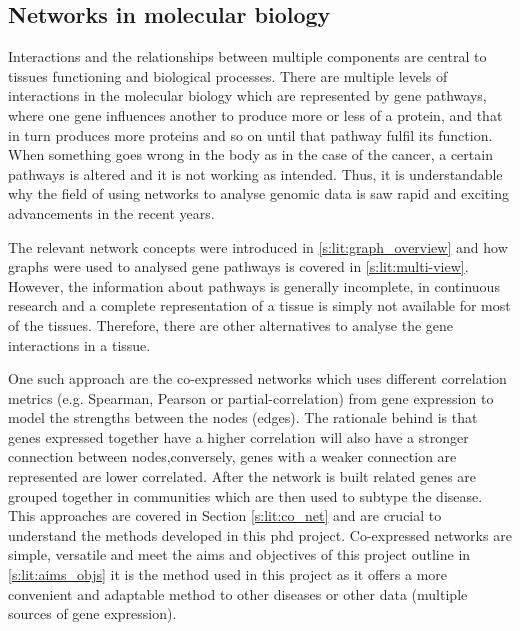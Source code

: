 \subsection{Networks in molecular biology} \label{s:lit:nets_bio}

\vspace{3mm}
\vspace{3mm}

Interactions and the relationships between multiple components are central to tissues functioning and biological processes. There are multiple levels of interactions in the molecular biology which are represented by gene pathways, where one gene influences another to produce more or less of a protein, and that in turn produces more proteins and so on until that pathway fulfil its function. When something goes wrong in the body as in the case of the cancer, a certain pathways is altered and it is not working as intended. Thus, it is understandable why the field of using networks to analyse genomic data is saw rapid and exciting advancements in the recent years. 

The relevant network concepts were introduced in \cref{s:lit:graph_overview}
and how graphs were used to analysed gene pathways is covered in \cref{s:lit:multi-view}. However, the information about pathways is generally incomplete, in continuous research and a complete representation of a tissue is simply not available for most of the tissues. Therefore, there are other alternatives to analyse the gene interactions in a tissue.

One such approach are the co-expressed networks which uses different correlation metrics (e.g. Spearman, Pearson or partial-correlation) from gene expression to model the strengths between the nodes (edges). The rationale behind is that genes expressed together have a higher correlation will also have a stronger connection between nodes,conversely, genes with a weaker connection are represented are lower correlated. After the network is built related genes are grouped together in communities which are then used to subtype the disease. This approaches are covered in Section \ref{s:lit:co_net} and are crucial to understand the methods developed in this phd project. Co-expressed networks are simple, versatile and meet the aims and objectives of this project outline in \cref{s:lit:aims_objs} it is the method used in this project as it offers a more convenient and adaptable method to other diseases or other data (multiple sources of gene expression).

